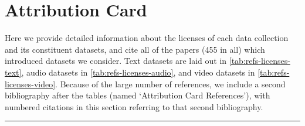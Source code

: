 \captionsetup{width=0.8\textwidth}

\section{Attribution Card}
\label{sec:attribution-card}

\noindent Here we provide detailed information about the licenses of each data collection and its constituent datasets, and cite all of the papers (455 in all) which introduced datasets we consider. Text datasets are laid out in \autoref{tab:refs-licenses-text}, audio datasets in \autoref{tab:refs-licenses-audio}, and video datasets in \autoref{tab:refs-licenses-video}. Because of the large number of references, we include a second bibliography after the tables (named `Attribution Card References'), with numbered citations in this section referring to that second bibliography.

\noindent\rule{\textwidth}{0.4pt}

\begin{refsection}
    \begingroup
        \renewcommand*{\arraystretch}{1.2}
        
        
        \clearpage
        
        
        \clearpage
        
    \endgroup
    
    \printbibliography[
        heading=subbibliography,
        title={Attribution Card References},
    ]
\end{refsection}